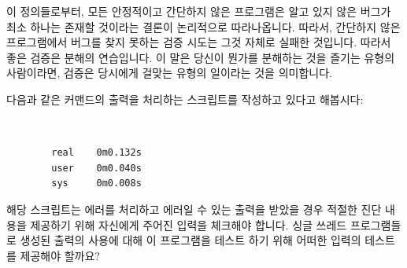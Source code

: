 이 정의들로부터, 모든 안정적이고 간단하지 않은 프로그램은 알고 있지 않은 버그가
최소 하나는 존재할 것이라는 결론이 논리적으로 따라나옵니다.
따라서, 간단하지 않은 프로그램에서 버그를 찾지 못하는 검증 시도는 그것 자체로
실패한 것입니다.
따라서 좋은 검증은 분해의 연습입니다.
이 말은 당신이 뭔가를 분해하는 것을 즐기는 유형의 사람이라면, 검증은 당시에게
걸맞는 유형의 일이라는 것을 의미합니다.

\QuickQuiz{}
	다음과 같은  커맨드의 출력을 처리하는 스크립트를 작성하고
	있다고 해봅시다:

	\vspace{5pt}
	\begin{minipage}[t]{\columnwidth}
	\tt
	\scriptsize
	\begin{verbatim}
		real    0m0.132s
		user    0m0.040s
		sys     0m0.008s
	\end{verbatim}
	\end{minipage}
	\vspace{5pt}

	해당 스크립트는 에러를 처리하고 에러일 수 있는  출력을 받았을
	경우 적절한 진단 내용을 제공하기 위해 자신에게 주어진 입력을 체크해야
	합니다.
	싱글 쓰레드 프로그램들로 생성된  출력의 사용에 대해 이
	프로그램을 테스트 하기 위해 어떠한 입력의 테스트를 제공해야 할까요?
	\iffalse

